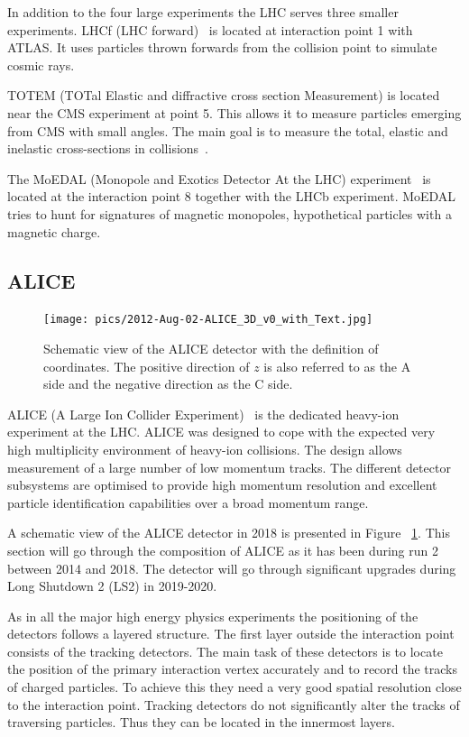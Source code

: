 In addition to the four large experiments the LHC serves three smaller experiments. LHCf (LHC forward)~\cite{Adriani:2008zz} is located at interaction point 1 with ATLAS. It uses particles thrown forwards from the collision point to simulate cosmic rays.

TOTEM (TOTal Elastic and diffractive cross section Measurement) is located near the CMS experiment at point 5. This allows it to measure particles emerging from CMS with small angles. The main goal is to measure the total, elastic and inelastic cross-sections in \pp collisions~\cite{Anelli:2008zza}.

The MoEDAL (Monopole and Exotics Detector At the LHC) experiment~\cite{MoEDAL:2016jlb} is located at the interaction point 8 together with the LHCb experiment. MoEDAL tries to hunt for signatures of magnetic monopoles, hypothetical particles with a magnetic charge.



\subsection{ALICE}
\label{sec:alice}
\begin{figure}[htb]

\centering
\texttt{[image: pics/2012-Aug-02-ALICE\_3D\_v0\_with\_Text.jpg]}
\caption[ALICE]{Schematic view of the ALICE detector with the definition of coordinates. The positive direction of $z$ is also referred to as the A side and the negative direction as the C side.}
\label{fig:alice}
\end{figure}

ALICE (A Large Ion Collider Experiment)~\cite{aliceDetector} is the dedicated heavy-ion experiment at the LHC. ALICE was designed to cope with the expected very high multiplicity environment of heavy-ion collisions. The design allows measurement of a large number of low momentum tracks. The different detector subsystems are optimised to provide high momentum resolution and excellent particle identification capabilities over a broad momentum range.

A schematic view of the ALICE detector in 2018 is presented in Figure ~\ref{fig:alice}. This section will go through the composition of ALICE as it has been during run 2 between 2014 and 2018. The detector will go through significant upgrades during Long Shutdown 2 (LS2) in 2019-2020. 

As in all the major high energy physics experiments the positioning of the detectors follows a layered structure. The first layer outside the interaction point consists of the tracking detectors. The main task of these detectors is to locate the position of the primary interaction vertex accurately and to record the tracks of charged particles. To achieve this they need a very good spatial resolution close to the interaction point. Tracking detectors do not significantly alter the tracks of traversing particles. Thus they can be located in the innermost layers.

